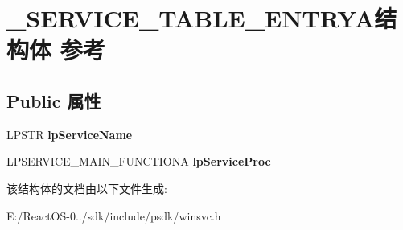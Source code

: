 \hypertarget{struct___s_e_r_v_i_c_e___t_a_b_l_e___e_n_t_r_y_a}{}\section{\+\_\+\+S\+E\+R\+V\+I\+C\+E\+\_\+\+T\+A\+B\+L\+E\+\_\+\+E\+N\+T\+R\+Y\+A结构体 参考}
\label{struct___s_e_r_v_i_c_e___t_a_b_l_e___e_n_t_r_y_a}
\subsection*{Public 属性}
\begin{DoxyCompactItemize}
\item 
\mbox{\label{struct___s_e_r_v_i_c_e___t_a_b_l_e___e_n_t_r_y_a_a525905616a336589f76c04971b320038}} 
L\+P\+S\+TR {\bfseries lp\+Service\+Name}
\item 
\mbox{\label{struct___s_e_r_v_i_c_e___t_a_b_l_e___e_n_t_r_y_a_aaee138c71f567f0c1b0ce84871a89f0d}} 
L\+P\+S\+E\+R\+V\+I\+C\+E\+\_\+\+M\+A\+I\+N\+\_\+\+F\+U\+N\+C\+T\+I\+O\+NA {\bfseries lp\+Service\+Proc}
\end{DoxyCompactItemize}


该结构体的文档由以下文件生成\+:\begin{DoxyCompactItemize}
\item 
E\+:/\+React\+O\+S-\/0../sdk/include/psdk/winsvc.\+h\end{DoxyCompactItemize}

